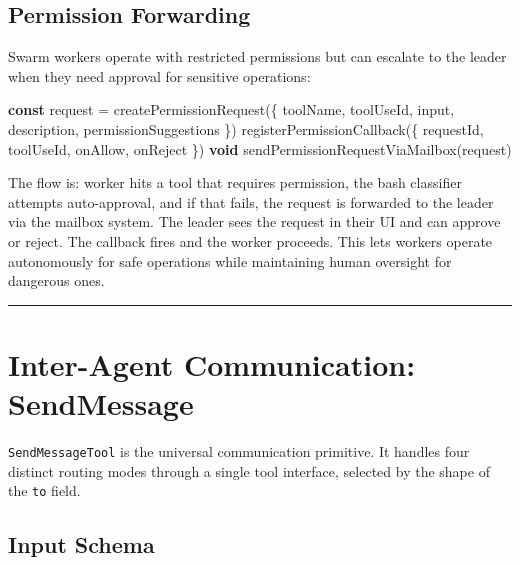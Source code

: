 \documentclass[
  english,
  11pt,
  letterpaper,
]{book}
\newenvironment{Shaded}{\begin{snugshade}}{\end{snugshade}}
\newcommand{\FunctionTok}[1]{\textcolor[rgb]{0.28,0.35,0.67}{#1}}
\newcommand{\KeywordTok}[1]{\textcolor[rgb]{0.00,0.23,0.31}{\textbf{#1}}}
\newcommand{\NormalTok}[1]{\textcolor[rgb]{0.00,0.23,0.31}{#1}}
\newcommand{\OperatorTok}[1]{\textcolor[rgb]{0.37,0.37,0.37}{#1}}
\begin{document}
\subsection{Permission Forwarding}\label{permission-forwarding}

Swarm workers operate with restricted permissions but can escalate to
the leader when they need approval for sensitive operations:

\begin{Shaded}
\begin{Highlighting}[]
\KeywordTok{const}\NormalTok{ request }\OperatorTok{=} \FunctionTok{createPermissionRequest}\NormalTok{(\{}
\NormalTok{  toolName}\OperatorTok{,}\NormalTok{ toolUseId}\OperatorTok{,}\NormalTok{ input}\OperatorTok{,}\NormalTok{ description}\OperatorTok{,}\NormalTok{ permissionSuggestions}
\NormalTok{\})}
\FunctionTok{registerPermissionCallback}\NormalTok{(\{ requestId}\OperatorTok{,}\NormalTok{ toolUseId}\OperatorTok{,}\NormalTok{ onAllow}\OperatorTok{,}\NormalTok{ onReject \})}
\KeywordTok{void} \FunctionTok{sendPermissionRequestViaMailbox}\NormalTok{(request)}
\end{Highlighting}
\end{Shaded}

The flow is: worker hits a tool that requires permission, the bash
classifier attempts auto-approval, and if that fails, the request is
forwarded to the leader via the mailbox system. The leader sees the
request in their UI and can approve or reject. The callback fires and
the worker proceeds. This lets workers operate autonomously for safe
operations while maintaining human oversight for dangerous ones.

\begin{center}\rule{0.5\linewidth}{0.5pt}\end{center}

\section{Inter-Agent Communication:
SendMessage}\label{inter-agent-communication-sendmessage}

\texttt{SendMessageTool} is the universal communication primitive. It
handles four distinct routing modes through a single tool interface,
selected by the shape of the \texttt{to} field.

\subsection{Input Schema}\label{input-schema}
\end{document}
